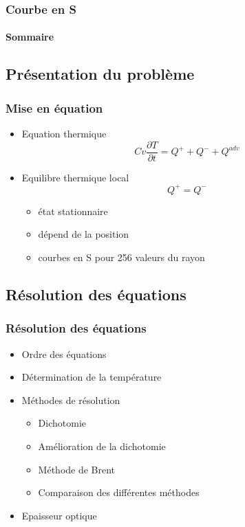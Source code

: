 \documentclass[french]{beamer}
\begin{document}
\begin{frame}
   \frametitle{Courbe en S}
   \framesubtitle{Sommaire}
   \tableofcontents[currentsection]
\end{frame}


\begin{frame}
\section{Présentation du problème}
\frametitle{Mise en équation}

   \begin{itemize}
      \item Equation thermique
      \begin{equation}
         Cv\frac{\partial T}{\partial t} = Q^+ + Q^- +Q^{adv}
      \end{equation}
      
   \item Equilibre thermique local
   \begin{equation}
      Q^+ = Q^- 
   \end{equation}
   
      \begin{itemize}
         \item état stationnaire
         \\
         \item dépend de la position
         \item courbes en S pour 256 valeurs du rayon
      \end{itemize}
\end{itemize}
\end{frame}

\begin{frame}
\section{Résolution des équations}
\frametitle{Résolution des équations}

   \begin{itemize}
      \item Ordre des équations
      \item Détermination de la température
      \item Méthodes de résolution
         \begin{itemize} 
            \item Dichotomie
            \item Amélioration de la dichotomie
            \item Méthode de Brent
            \item Comparaison des différentes méthodes
         \end{itemize}
      \item Epaisseur optique
   \end{itemize}
\end{frame}
\end{document}
